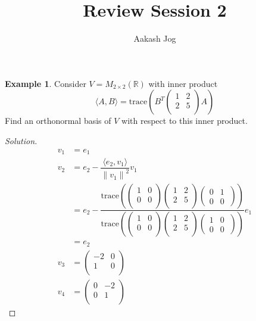 \documentclass[fleqn, a4paper, 12pt]{article}
\title{Review Session 2}
\author{Aakash Jog}
\date{\formatdate{25}{1}{2015}}
\theoremstyle{definition}
\newtheorem{example}{Example} %
\theoremstyle{theorem}
\theoremstyle{remark}
\newcommand{\trace}{\mathrm{trace}}
\newenvironment{solution} %
	{\begin{proof}[Solution]\let\qed\relax}
	{\end{proof}}
\numberwithin{corollary}{theorem}
\numberwithin{equation}{theorem}
\begin{document}
\maketitle

\begin{example}
	Consider $V = M_{2 \times 2}(\mathbb{R})$ with inner product 
	\begin{equation*}
		\langle A, B \rangle = \trace 
			\left(
				B^T 
					\begin{pmatrix}
						1 & 2\\
						2 & 5\\
					\end{pmatrix}
				A
			\right)
	\end{equation*}
	Find an orthonormal basis of $V$ with respect to this inner product.
\end{example}

\begin{solution}
	\begin{align*}
		v_1 &= e_1\\
		v_2 &= e_2 - \dfrac{\langle e_2, v_1 \rangle}{{\| v_1 \|}^2} v_1\\
		&= e_2 - 
			\dfrac
			{\trace
				\left( 
					\begin{pmatrix}
						1 & 0\\
						0 & 0\\
					\end{pmatrix}
					\begin{pmatrix}
						1 & 2\\
						2 & 5\\
					\end{pmatrix}
					\begin{pmatrix}
						0 & 1\\
						0 & 0\
					\end{pmatrix}
				\right)
			}
			{\trace
				\left( 
				\begin{pmatrix}
				1 & 0\\
				0 & 0\\
				\end{pmatrix}
				\begin{pmatrix}
				1 & 2\\
				2 & 5\\
				\end{pmatrix}
				\begin{pmatrix}
				1 & 0\\
				0 & 0\
				\end{pmatrix}
				\right)
			}
			e_1\\
		&= e_2\\
		v_3 &= 
			\begin{pmatrix}
				-2 & 0\\
				1 & 0\\
			\end{pmatrix}\\
		v_4 &= 
			\begin{pmatrix}
				0 & -2\\
				0 & 1\\
			\end{pmatrix}
	\end{align*}
\end{solution}
\end{document}
